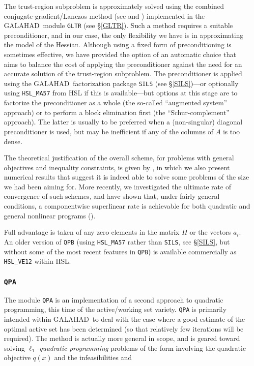 \documentclass[twoside]{article}
\newcommand{\gal}{{\sf GALAHAD}}
\newcommand{\ltsubsubsection}[1]{\subsubsection{{\tt #1}} \label{#1}}
\begin{document}
The trust-region subproblem is approximately solved using the 
combined conjugate-gradient/Lan\-czos method (see  and
) implemented in the \gal\ module {\tt GLTR}
(see \S\ref{GLTR}).
Such a method requires a suitable preconditioner,
and in our case, the only flexibility we have is in approximating the
model of the Hessian. Although using a fixed form of preconditioning is
sometimes effective, we have provided the option of an automatic choice
that aims to balance the cost of applying the preconditioner against
the need for an accurate solution of the trust-region subproblem. 
The preconditioner is applied using the \gal\ factorization package
{\tt SILS} (see \S\ref{SILS})---or optionally using {\tt HSL\_MA57} 
from HSL if this is available---but options at this stage are
to factorize the preconditioner as a whole (the so-called ``augmented system''
approach) or to perform a block elimination first (the ``Schur-complement''
approach). The latter is usually to be preferred when a (non-singular) diagonal 
preconditioner is used, but may be inefficient if any of the columns
of $A$ is too dense.

The theoretical justification of the
overall scheme, for problems with general objectives and 
inequality constraints, 
is given by , in which we also present
numerical results that suggest it is indeed able to solve 
some problems of the size we had been aiming for. 
More recently, we investigated the ultimate rate of convergence
of such schemes, and have shown that, under fairly general conditions, 
a componentwise superlinear rate is achievable for both quadratic and general 
nonlinear programs ().

Full advantage is taken of any zero elements in the matrix $H$ or the
vectors $a_{i}$.
An older version of {\tt QPB} (using {\tt HSL\_MA57} rather than {\tt SILS},
see \S\ref{SILS}, but without some of the most recent features in {\tt QPB})
is available commercially as {\tt HSL\_VE12} within HSL.

\ltsubsubsection{QPA}

The module {\tt QPA} is an implementation of a second approach
to quadratic programming, this time of the active/working set variety.
{\tt QPA} is primarily intended within \gal\ to deal with the case 
where a good
estimate of the optimal active set has been determined (so that
relatively few iterations will be required). The method is actually more
general in scope, and is geared toward solving
{\em $\mathbf{\ell_1}$-quadratic programming} problems of the form
involving the quadratic objective $q(x)$ and the infeasibilities
and
\end{document}

